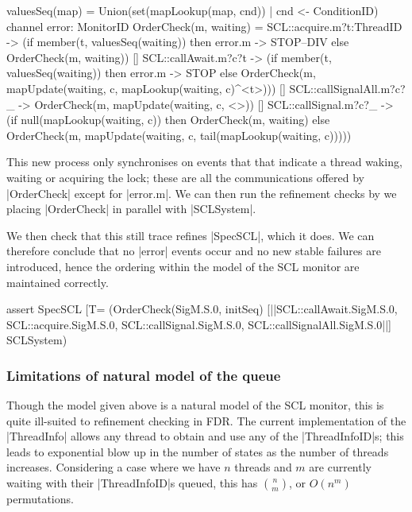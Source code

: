\begin{cspm}
valuesSeq(map) = Union({set(mapLookup(map, cnd)) | cnd <- ConditionID})
channel error: MonitorID
OrderCheck(m, waiting) = 
      SCL::acquire.m?t:ThreadID -> 
      (if member(t, valuesSeq(waiting)) then error.m -> STOP--DIV
        else OrderCheck(m, waiting))
  [] SCL::callAwait.m?c?t -> 
      (if member(t, valuesSeq(waiting)) then error.m -> STOP
        else OrderCheck(m, mapUpdate(waiting, c, mapLookup(waiting, c)^<t>)))
  [] SCL::callSignalAll.m?c?_ -> 
        OrderCheck(m, mapUpdate(waiting, c, <>))
  [] SCL::callSignal.m?c?_ -> 
      (if null(mapLookup(waiting, c)) then OrderCheck(m, waiting)
        else OrderCheck(m, mapUpdate(waiting, c, 
                                    tail(mapLookup(waiting, c)))))
\end{cspm}

This new process only synchronises on events that that indicate a thread waking, waiting or acquiring the lock; these are all the communications offered by |OrderCheck| except for |error.m|. We can then run the refinement checks by we placing |OrderCheck| in parallel with |SCLSystem|. 

We then check that this still trace refines |SpecSCL|, which it does. We can therefore conclude that no |error| events occur and no new stable failures are introduced, hence the ordering within the model of the SCL monitor are maintained correctly.

\begin{cspm}
assert SpecSCL [T= (OrderCheck(SigM.S.0, initSeq) 
                     [|{|SCL::callAwait.SigM.S.0,
                         SCL::acquire.SigM.S.0,
                         SCL::callSignal.SigM.S.0,
                         SCL::callSignalAll.SigM.S.0|}|] SCLSystem)
\end{cspm}

\subsubsection{Limitations of natural model of the queue}

Though the model given above is a natural model of the SCL monitor, this is quite ill-suited to refinement checking in FDR. The current implementation of the |ThreadInfo| allows any thread to obtain and use any of the |ThreadInfoID|s; this leads to exponential blow up in the number of states as the number of threads increases. Considering a case where we have $n$ threads and $m$ are currently waiting with their |ThreadInfoID|s queued, this has $n\choose{m}$, or $O(n^{m})$ permutations.

